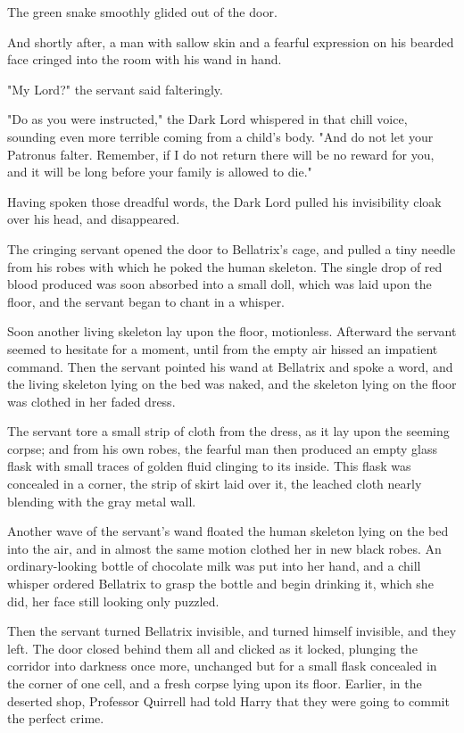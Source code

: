 The green snake smoothly glided out of the door.

And shortly after, a man with sallow skin and a fearful expression on his 
bearded face cringed into the room with his wand in hand.

"My Lord?" the servant said falteringly.

"Do as you were instructed," the Dark Lord whispered in that chill voice, 
sounding even more terrible coming from a child's body. "And do not let your 
Patronus falter. Remember, if I do not return there will be no reward for you, 
and it will be long before your family is allowed to die."

Having spoken those dreadful words, the Dark Lord pulled his invisibility cloak 
over his head, and disappeared.

The cringing servant opened the door to Bellatrix's cage, and pulled a tiny 
needle from his robes with which he poked the human skeleton. The single drop 
of red blood produced was soon absorbed into a small doll, which was laid upon 
the floor, and the servant began to chant in a whisper.

Soon another living skeleton lay upon the floor, motionless. Afterward the 
servant seemed to hesitate for a moment, until from the empty air hissed an 
impatient command. Then the servant pointed his wand at Bellatrix and spoke a 
word, and the living skeleton lying on the bed was naked, and the skeleton 
lying on the floor was clothed in her faded dress.

The servant tore a small strip of cloth from the dress, as it lay upon the 
seeming corpse; and from his own robes, the fearful man then produced an empty 
glass flask with small traces of golden fluid clinging to its inside. This 
flask was concealed in a corner, the strip of skirt laid over it, the leached 
cloth nearly blending with the gray metal wall.

Another wave of the servant's wand floated the human skeleton lying on the bed 
into the air, and in almost the same motion clothed her in new black robes. An 
ordinary-looking bottle of chocolate milk was put into her hand, and a chill 
whisper ordered Bellatrix to grasp the bottle and begin drinking it, which she 
did, her face still looking only puzzled.

Then the servant turned Bellatrix invisible, and turned himself invisible, and 
they left. The door closed behind them all and clicked as it locked, plunging 
the corridor into darkness once more, unchanged but for a small flask concealed 
in the corner of one cell, and a fresh corpse lying upon its floor.
\sbreak
Earlier, in the deserted shop, Professor Quirrell had told Harry that they were 
going to commit the perfect crime.

